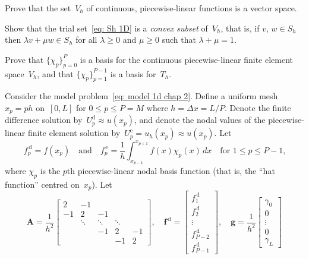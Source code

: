 \begin{Exercises}

\exercise\label{ex: V_h vector space}
Prove that the set~$V_h$ of continuous, piecewise-linear functions is a vector 
space.

\exercise
Show that the trial set~\eqref{eq: Sh 1D} is a \emph{convex subset} of~$V_h$,
that is, if $v$, $w\in S_h$ then $\lambda v+\mu w\in S_h$ for all $\lambda\ge0$
and $\mu\ge0$ such that $\lambda+\mu=1$.

\exercise
Prove that $\{\chi_p\}_{p=0}^P$ is a basis for the continuous piecewise-linear
finite element space~$V_h$, and that $\{\chi_p\}_{p=1}^{P-1}$ is a basis
for~$T_h$.

\exercise
Consider the model problem~\eqref{eq: model 1d chap 2}.  Define a uniform 
mesh~$x_p=ph$ on~$[0,L]$ for $0\le p\le P=M$ where $h=\Delta x=L/P$.  Denote 
the finite difference solution by~$U^{\mathrm{d}}_p\approx u(x_p)$, and denote 
the nodal values of the piecewise-linear finite element solution 
by~$U^{\mathrm{e}}_p=u_h(x_p)\approx u(x_p)$.  Let 
\[
f^{\,\mathrm{d}}_p=f(x_p)\quad\text{and}\quad
f^{\,\mathrm{e}}_p=\frac{1}{h}\int_{x_{p-1}}^{x_{p+1}}f(x)\chi_p(x)\,dx
\quad\text{for $1\le p\le P-1$,}
\]
where $\chi_p$ is the $p$th piecewise-linear nodal basis function (that is, the 
``hat function'' centred on~$x_p$).  Let
\[
\boldsymbol{A}=\frac{1}{h^2}\left[\begin{array}{rrrrr}
 2&    -1&      &      &\\
-1&     2&    -1&      &\\
  &\ddots&\ddots&\ddots&\\
  &      &    -1&     2&-1\\
  &      &      &    -1& 2
\end{array}\right],\quad
\boldsymbol{f}^{\,\mathrm{d}}=\begin{bmatrix}
f^{\,\mathrm{d}}_1\\                              
f^{\,\mathrm{d}}_2\\                              
\vdots\\
f^{\,\mathrm{d}}_{P-2}\\                              
f^{\,\mathrm{d}}_{P-1}                              
\end{bmatrix},\quad
\boldsymbol{g}=\frac{1}{h^2}\begin{bmatrix}
\gamma_0\\ 0\\ \vdots\\ 0\\ \gamma_L                            

\end{bmatrix}\]
\end{Exercises}
